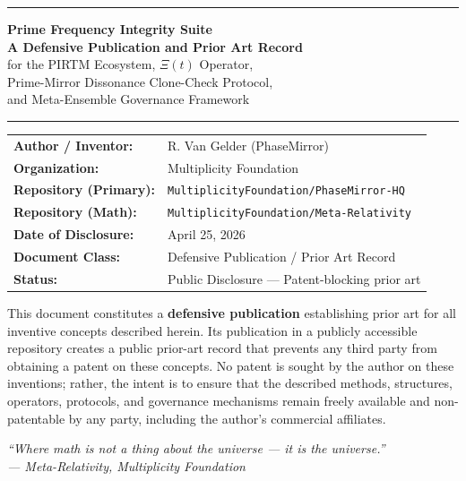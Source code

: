 \documentclass[12pt,letterpaper]{article}
\theoremstyle{definition}
\theoremstyle{remark}
\begin{document}
\begin{titlepage}
\centering
\vspace*{1.5cm}

{\color{primeviolet}\rule{\linewidth}{1.5pt}}
\vspace{0.4cm}

{\Huge\bfseries Prime Frequency Integrity Suite}\\[0.4em]
{\Large\bfseries A Defensive Publication and Prior Art Record}\\[0.8em]
{\large\color{primeviolet} for the PIRTM Ecosystem, $\Xi(t)$ Operator,\\
Prime-Mirror Dissonance Clone-Check Protocol,\\
and Meta-Ensemble Governance Framework}

\vspace{0.4cm}
{\color{primeviolet}\rule{\linewidth}{1.5pt}}
\vspace{1.2cm}

\begin{tabular}{ll}
\textbf{Author / Inventor:} & R. Van Gelder (PhaseMirror) \\
\textbf{Organization:}      & Multiplicity Foundation \\
\textbf{Repository (Primary):} & \texttt{MultiplicityFoundation/PhaseMirror-HQ} \\
\textbf{Repository (Math):}    & \texttt{MultiplicityFoundation/Meta-Relativity} \\
\textbf{Date of Disclosure:}   & April 25, 2026 \\
\textbf{Document Class:}       & Defensive Publication / Prior Art Record \\
\textbf{Status:}               & Public Disclosure --- Patent-blocking prior art \\
\end{tabular}

\vspace{1.5cm}

\begin{tcolorbox}[colback=invariantbg,colframe=primeviolet,title={\bfseries Purpose of This Document}]
This document constitutes a \textbf{defensive publication} establishing prior art for all inventive concepts described herein. Its publication in a publicly accessible repository creates a public prior-art record that prevents any third party from obtaining a patent on these concepts. No patent is sought by the author on these inventions; rather, the intent is to ensure that the described methods, structures, operators, protocols, and governance mechanisms remain freely available and non-patentable by any party, including the author's commercial affiliates.
\end{tcolorbox}

\vspace{1cm}
\textit{``Where math is not a thing about the universe --- it is the universe.''}\\
\textit{--- Meta-Relativity, Multiplicity Foundation}

\end{titlepage}
\end{document}
